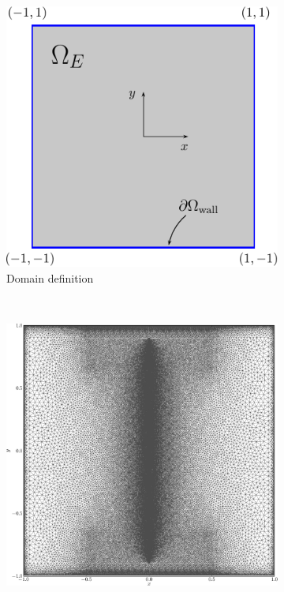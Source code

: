 	\begin{figure}[t]
     \centering
     \begin{subfigure}[t]{0.45\textwidth}
             \includegraphics[width=\textwidth]{figures/eulerian/clercxBruneauDomainDefinition-crop.pdf}
             \caption{Domain definition}
             \label{fig:clercxBruneauDomainDefinition}
     \end{subfigure}%
     ~ %
     \begin{subfigure}[t]{0.45\textwidth}
             \includegraphics[width=\textwidth]{figures/eulerian/clercxBruneauDomainMesh-crop.pdf}

\end{subfigure}
\end{figure}
